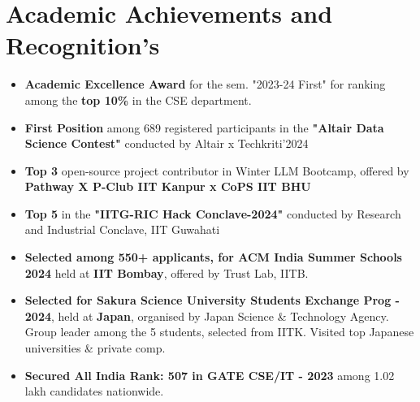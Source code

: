 \documentclass[10.8pt, a4paper]{extarticle}
\newcommand{\shorterSection}[1]{\vspace{-10pt}\section{#1}}
\begin{document}
\shorterSection{Academic Achievements and Recognition's}
\begin{itemize}

 \item \textbf{Academic Excellence Award} for the sem. "2023-24 First" for ranking among the \textbf{top 10\%} in the CSE department.\href{https://www.iitk.ac.in/sspc/data/2nd-list-of-Academic-Excellence-Awards-2023-21-03-24.pdf}{\faLink{}} \href{https://drive.google.com/file/d/1jnb98lF2TscnxkIrKWC_X26nIbIIifDF/view?usp=sharing}{\faLink{}} \\[-0.6cm]
 
 
  \item \textbf{First Position} among 689 registered participants in the \textbf{"Altair Data Science Contest"} conducted by Altair x Techkriti'2024 \href{https://drive.google.com/file/d/1D9f-N0dg1hDBg25C0PcwicyXPSVoKH6y/view?usp=sharing}{\faLink{}} \href{https://www.linkedin.com/feed/update/urn:li:activity:7209120328172589056/}{\faLink{}} 

    \item {\textbf{Top 3 }}open-source project contributor in Winter LLM Bootcamp, offered by \textbf{Pathway X P-Club IIT Kanpur x CoPS IIT BHU} \href{https://drive.google.com/file/d/1IfNvpMIZuecpOPDMtjZ7ORE86eddqhK-/view?usp=sharing}{\faEnvelope{}} \href{https://t.certifier.io/CL0/https:%2F%2Fapi.credsverse.com%2Fv1%2Fusers%2Finvite%2Fceed2b44-26ae-4085-a1c6-291760efed0a/1/0102018ede88dc5e-89a09bd7-6cea-4807-a2c9-3dff747834d9-000000/_U00joiSf7_qp3anDSJNAiO00y7Hxm7ONFmpv6zOP2g=348}{\faLink{}}   \\[-0.6cm]
    
\item \textbf{Top 5} in the \textbf{"IITG-RIC Hack Conclave-2024"} conducted by Research and Industrial Conclave, IIT Guwahati \href{https://drive.google.com/file/d/1Ck94WUX1KaKJrRHAmt-HNdJeLTmaMKdR/view?usp=sharing}{\faEnvelope{}}

    \item {\textbf{Selected among 550+ applicants, for ACM India Summer Schools 2024}} held at {\textbf{IIT Bombay}}, offered by Trust Lab, IITB. \href{https://drive.google.com/file/d/1mHDlgpKEQpYF-BHE-QLPfYljADycJgEZ/view?usp=sharing}{\faLink{}}
    \href{https://trustlab.iitb.ac.in/trust-matters-2024-jun-summer-school-on-cryptography}{\faLink{}}


   \item {\textbf{Selected for Sakura Science University Students Exchange Prog - 2024}}, held at {\textbf{Japan}}, organised by Japan Science \& Technology Agency. Group leader among the 5 students, selected from IITK. Visited top Japanese universities \& private comp.   \href{https://drive.google.com/file/d/1cprXZQaC9tLiOLi9QPF0u9wuk8HzhmZm/view?usp=sharing}{\faLink{}}
   \href{https://www.iitk.ac.in/oir/news/sakura-science-indian-university-program-2024}{\faLink{}}
   \href{https://www.kyoto-u.ac.jp/en/news/2024-09-27}{\faLink{}}
   \href{https://drive.google.com/file/d/13dJY_7wRybMbRPXjsnNkt_SIvyQEV9FJ/view?usp=sharing}{\faLink{}}

   \item \textbf{ Secured All India Rank: 507 in GATE CSE/IT - 2023} among 1.02 lakh candidates nationwide. \href{https://drive.google.com/file/d/1IkVH0v_xUTgL83VHjq7N5oFpSjw99Zma/view?usp=drive_link}{}


\end{itemize}
\medskip
\end{document}
